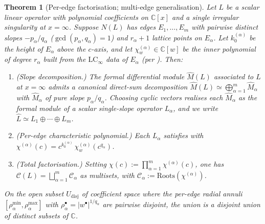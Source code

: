 \documentclass[11pt,a4paper]{article}
\theoremstyle{plain}
\newtheorem{theorem}{Theorem}[section]
\theoremstyle{definition}
\theoremstyle{remark}
\newcommand{\LCinf}{\mathrm{LC}_\infty}
\newcommand{\Roots}{\mathrm{Roots}}
\newcommand{\NL}{N(L)}
\newcommand{\Cl}{\mathcal{C}}
\begin{document}
\begin{theorem}[Per-edge factorisation; multi-edge generalisation]\label{thm:M1}
Let $L$ be a scalar linear operator with polynomial coefficients on
$\mathbb{C}[x]$ and a single irregular singularity at $x = \infty$. Suppose
$\NL$ has edges $E_1, \dots, E_m$ with pairwise distinct slopes
$-p_\alpha / q_\alpha$ ($\gcd(p_\alpha, q_\alpha) = 1$) and $r_\alpha + 1$
lattice points on $E_\alpha$. Let $k_0^{(\alpha)}$ be the height of $E_\alpha$
above the $c$-axis, and let $\chi_w^{(\alpha)} \in \mathbb{C}[w]$ be the
inner polynomial of degree $r_\alpha$ built from the $\LCinf$ data of
$E_\alpha$ (per ). Then:
\begin{enumerate}[leftmargin=2em]
\item (Slope decomposition.) The formal differential module
      $\widehat{M}(L)$ associated to $L$ at $x = \infty$ admits a canonical
      direct-sum decomposition $\widehat{M}(L) \simeq \bigoplus_{\alpha=1}^{m}
      \widehat{M}_\alpha$ with $\widehat{M}_\alpha$ of pure slope
      $p_\alpha / q_\alpha$. Choosing cyclic vectors realises each
      $\widehat{M}_\alpha$ as the formal module of a scalar single-slope
      operator $L_\alpha$, and we write
      $\widehat{L} \simeq L_1 \oplus \cdots \oplus L_m$.
\item (Per-edge characteristic polynomial.) Each $L_\alpha$ satisfies
       with
      $\chi^{(\alpha)}(c) = c^{k_0^{(\alpha)}}\, \chi_w^{(\alpha)}(c^{q_\alpha})$.
\item (Total factorisation.) Setting $\chi(c) := \prod_{\alpha=1}^{m}
      \chi^{(\alpha)}(c)$, one has
      $\Cl(L) = \bigsqcup_{\alpha=1}^{m} \Cl_\alpha$ as multisets, with
      $\Cl_\alpha := \Roots(\chi^{(\alpha)})$.
\end{enumerate}
On the open subset $U_{\mathrm{disj}}$ of coefficient space where the
per-edge radial annuli $[\rho_\alpha^{\min}, \rho_\alpha^{\max}]$ with
$\rho_\alpha^{\bullet} = |w^\bullet|^{1/q_\alpha}$ are pairwise disjoint,
the union is a disjoint union of \emph{distinct} subsets of $\mathbb{C}$.
\end{theorem}
\end{document}
